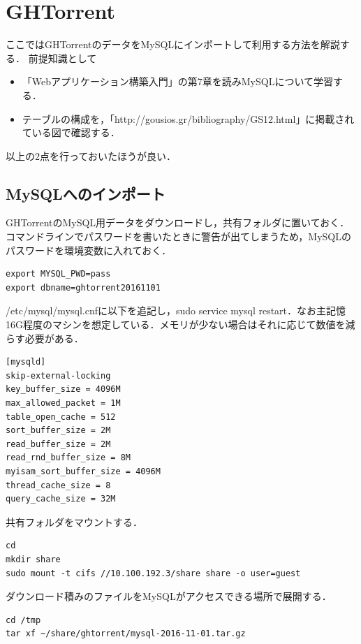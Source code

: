 \newpage

\section{GHTorrent}
ここではGHTorrentのデータをMySQLにインポートして利用する方法を解説する．
前提知識として
\begin{itemize}
\item 「Webアプリケーション構築入門」の第7章を読みMySQLについて学習する．
\item テーブルの構成を，「http://gousios.gr/bibliography/GS12.html」に掲載されている図で確認する．
\end{itemize}
 以上の2点を行っておいたほうが良い．
 
 \subsection{MySQLへのインポート}
  GHTorrentのMySQL用データをダウンロードし，共有フォルダに置いておく．
 コマンドラインでパスワードを書いたときに警告が出てしまうため，MySQLのパスワードを環境変数に入れておく．
 
\begin{lstlisting}[basicstyle=\ttfamily\footnotesize, frame=single]
export MYSQL_PWD=pass
export dbname=ghtorrent20161101
\end{lstlisting}
 
 /etc/mysql/mysql.cnfに以下を追記し，sudo service mysql restart．なお主記憶16G程度のマシンを想定している．メモリが少ない場合はそれに応じて数値を減らす必要がある．
 
\begin{lstlisting}[basicstyle=\ttfamily\footnotesize, frame=single]
[mysqld]
skip-external-locking
key_buffer_size = 4096M
max_allowed_packet = 1M
table_open_cache = 512
sort_buffer_size = 2M
read_buffer_size = 2M
read_rnd_buffer_size = 8M
myisam_sort_buffer_size = 4096M
thread_cache_size = 8
query_cache_size = 32M
\end{lstlisting}
 
共有フォルダをマウントする．
 
\begin{lstlisting}[basicstyle=\ttfamily\footnotesize, frame=single]
cd
mkdir share
sudo mount -t cifs //10.100.192.3/share share -o user=guest
\end{lstlisting}
 ダウンロード積みのファイルをMySQLがアクセスできる場所で展開する．
 
\begin{lstlisting}[basicstyle=\ttfamily\footnotesize, frame=single]
cd /tmp
tar xf ~/share/ghtorrent/mysql-2016-11-01.tar.gz
\end{lstlisting}

